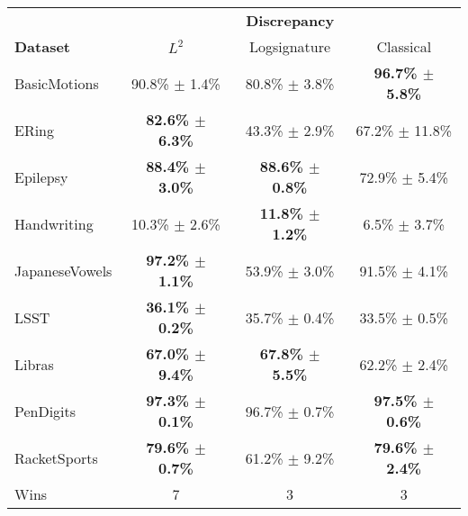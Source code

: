\begin{tabular}{lccc}
\toprule
{} & \multicolumn{3}{c}{\textbf{Discrepancy}} \\
\textbf{Dataset} &          $L^2$ &   Logsignature &                Classical \\
\midrule
BasicMotions    &    90.8\% $\pm$ 1.4\% &  80.8\% $\pm$ 3.8\% &  \textbf{96.7\% $\pm$ 5.8\%} \\
ERing           &    \textbf{82.6\% $\pm$ 6.3\%} &  43.3\% $\pm$ 2.9\% &  67.2\% $\pm$ 11.8\% \\
Epilepsy        &    \textbf{88.4\% $\pm$ 3.0\%} &  \textbf{88.6\% $\pm$ 0.8\%} &  72.9\% $\pm$ 5.4\% \\
Handwriting     &    10.3\% $\pm$ 2.6\% &  \textbf{11.8\% $\pm$ 1.2\%} &  6.5\% $\pm$ 3.7\% \\
JapaneseVowels  &    \textbf{97.2\% $\pm$ 1.1\%} &  53.9\% $\pm$ 3.0\% &  91.5\% $\pm$ 4.1\% \\
LSST            &    \textbf{36.1\% $\pm$ 0.2\%} &  35.7\% $\pm$ 0.4\% &  33.5\% $\pm$ 0.5\% \\
Libras          &    \textbf{67.0\% $\pm$ 9.4\%} &  \textbf{67.8\% $\pm$ 5.5\%} &  62.2\% $\pm$ 2.4\% \\
PenDigits       &    \textbf{97.3\% $\pm$ 0.1\%} &  96.7\% $\pm$ 0.7\% &  \textbf{97.5\% $\pm$ 0.6\%} \\
RacketSports    &    \textbf{79.6\% $\pm$ 0.7\%} &  61.2\% $\pm$ 9.2\% &  \textbf{79.6\% $\pm$ 2.4\%} \\
\midrule
Wins &            7 &                 3 &    3 \\
\bottomrule
\end{tabular}
